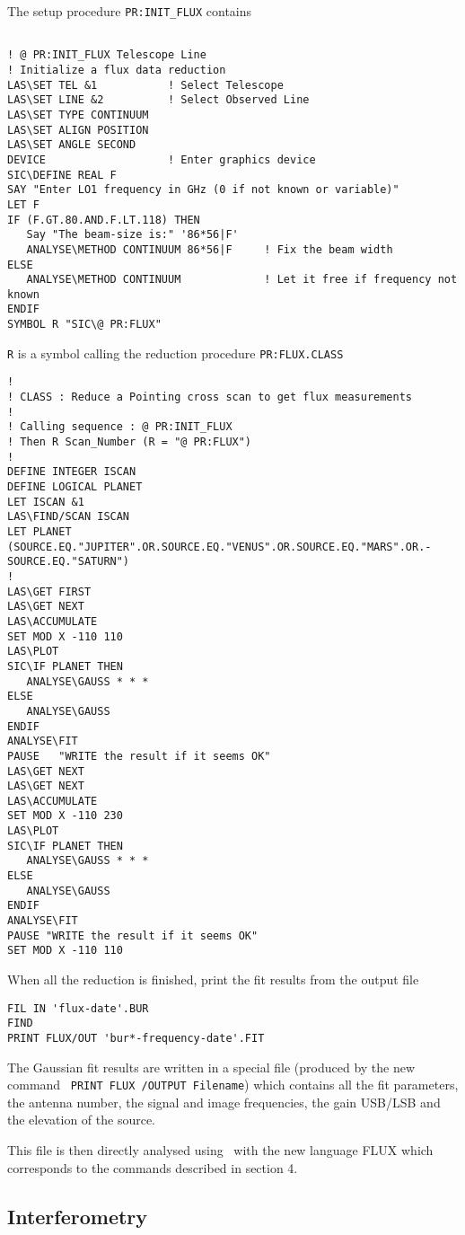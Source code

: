 \documentclass[11pt]{article}
\begin{document}
The setup procedure {\tt PR:INIT\_FLUX} contains
\begin{verbatim}

! @ PR:INIT_FLUX Telescope Line
! Initialize a flux data reduction
LAS\SET TEL &1           ! Select Telescope 
LAS\SET LINE &2          ! Select Observed Line
LAS\SET TYPE CONTINUUM
LAS\SET ALIGN POSITION
LAS\SET ANGLE SECOND
DEVICE                   ! Enter graphics device
SIC\DEFINE REAL F
SAY "Enter LO1 frequency in GHz (0 if not known or variable)"
LET F
IF (F.GT.80.AND.F.LT.118) THEN
   Say "The beam-size is:" '86*56|F'  
   ANALYSE\METHOD CONTINUUM 86*56|F     ! Fix the beam width
ELSE
   ANALYSE\METHOD CONTINUUM             ! Let it free if frequency not known
ENDIF
SYMBOL R "SIC\@ PR:FLUX"
\end{verbatim}

{\tt R} is a symbol calling the reduction procedure {\tt PR:FLUX.CLASS}
\begin{verbatim}
!
! CLASS : Reduce a Pointing cross scan to get flux measurements
!
! Calling sequence : @ PR:INIT_FLUX
! Then R Scan_Number (R = "@ PR:FLUX")
!
DEFINE INTEGER ISCAN
DEFINE LOGICAL PLANET
LET ISCAN &1
LAS\FIND/SCAN ISCAN
LET PLANET (SOURCE.EQ."JUPITER".OR.SOURCE.EQ."VENUS".OR.SOURCE.EQ."MARS".OR.-
SOURCE.EQ."SATURN") 
!
LAS\GET FIRST
LAS\GET NEXT
LAS\ACCUMULATE
SET MOD X -110 110
LAS\PLOT
SIC\IF PLANET THEN
   ANALYSE\GAUSS * * *
ELSE
   ANALYSE\GAUSS
ENDIF
ANALYSE\FIT
PAUSE   "WRITE the result if it seems OK"
LAS\GET NEXT
LAS\GET NEXT
LAS\ACCUMULATE
SET MOD X -110 230
LAS\PLOT
SIC\IF PLANET THEN
   ANALYSE\GAUSS * * *
ELSE
   ANALYSE\GAUSS
ENDIF
ANALYSE\FIT
PAUSE "WRITE the result if it seems OK"
SET MOD X -110 110
\end{verbatim}

When all the reduction is finished, print the fit results from the output
file
\begin{verbatim}
FIL IN 'flux-date'.BUR
FIND
PRINT FLUX/OUT 'bur*-frequency-date'.FIT
\end{verbatim}

The Gaussian fit results are written in a special file (produced by the new
command {\class\ \tt PRINT FLUX /OUTPUT Filename}) which contains all the
fit parameters, the antenna number, the signal and image frequencies, the
gain USB/LSB and the elevation of the source.

This file is then directly analysed using \astro\ with the new language
FLUX which corresponds to the commands described in section 4.

\subsection{Interferometry}
\end{document}
